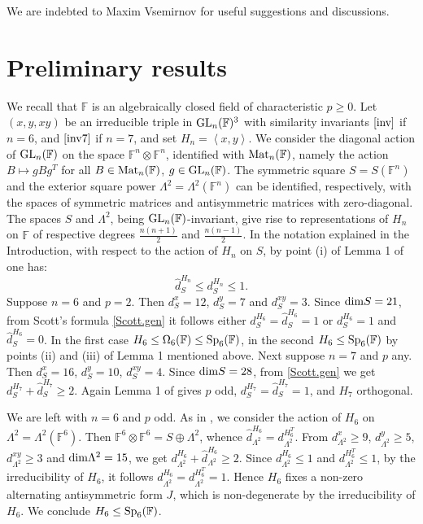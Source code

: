 \documentclass{amsart}
\theoremstyle{remark}
\begin{document}
We are indebted to Maxim Vsemirnov for useful suggestions and discussions.

\section{Preliminary results}\label{prelim}

We recall that ${\mathbb{F}}$ is an algebraically closed field of characteristic $p\ge 0$.
Let $(x,y,xy)$ be an irreducible triple in ${\mathop{\rm GL}\nolimits}_n({\mathbb{F}})^3$
with similarity invariants $\eqref{inv}$ if $n=6$, and $\eqref{inv7}$ if  $n=7$, 
and set $H_n=\left\langle x,y\right\rangle$.
We consider the diagonal action of ${\mathop{\rm GL}\nolimits}_n({\mathbb{F}})$ on the space ${\mathbb{F}}^n\otimes {\mathbb{F}}^n$,
identified with ${\mathop{\rm Mat}\nolimits}_n({\mathbb{F}})$, namely the action $B\mapsto gBg^T$ for all $B\in {\mathop{\rm Mat}\nolimits}_n({\mathbb{F}})$, $g\in{\mathop{\rm GL}\nolimits}_n({\mathbb{F}})$.  
The symmetric square $S=S({\mathbb{F}}^n)$ and the exterior 
square power $\Lambda^ 2=\Lambda^2({\mathbb{F}}^n)$ can be identified, respectively, with the spaces
of symmetric matrices
and antisymmetric matrices with zero-diagonal. The spaces $S$ and  $\Lambda^ 2$, being ${\mathop{\rm GL}\nolimits}_n({\mathbb{F}})$-invariant,
give rise to representations of $H_n$ on ${\mathbb{F}}$ of respective degrees $\frac{n(n+1)}{2}$ and
$\frac{n(n-1)}{2}$.
In the notation explained in the Introduction, with respect to 
the action of $H_n$ on  $S$, by point (i) of Lemma 1 of \cite{TV1} one has:
$$\hat d_{S }^ {H_n}\le d_{S}^ {H_n} \le 1 .$$
Suppose $n=6$ and $p=2$. Then $d_{S}^ x= 12$, $d_{S}^ y= 7$ and $d_{S}^ {xy}= 3$.
Since ${\mathop{\rm dim}\nolimits } S=21$, from  Scott's formula \eqref{Scott.gen} it follows  either 
$d_S^{H_6}= \hat d_S^ {H_6}= 1$ or $d_S^ {H_6}=1$ and $\hat d_S^{H_6}=0$.
In the first case $H_6\le \Omega_6({\mathbb{F}})\le {\mathop{\rm Sp}\nolimits}_6({\mathbb{F}})$, in the second $H_6\le {\mathop{\rm Sp}\nolimits}_6({\mathbb{F}})$  by points (ii)
and  (iii) of Lemma 1 mentioned above.
Next suppose $n=7$ and $p$ any. Then  $d_{S}^ x= 16$, $d_{S}^ y= 10$, $d_{S}^ {xy}= 4$.  Since ${\mathop{\rm dim}\nolimits } S=28$, 
from  \eqref{Scott.gen} we get $d_S^{H_7}+\hat d_S^ {H_7}\ge 2$. Again Lemma 1 of \cite{TV1} gives $p$ odd,
$d_S^{H_7}= \hat d_S^ {H_7}= 1$, and $H_7$ orthogonal.

We are left with  $n=6$ and $p$ odd. As in \cite{V3}, we consider the action 
of $H_6$ on $\Lambda^ 2=\Lambda^2({\mathbb{F}}^6)$.
Then ${\mathbb{F}}^6\otimes {\mathbb{F}}^6= S\oplus \Lambda^2$, whence
$\hat d_{\Lambda ^2}^{H_6}=d_{\Lambda ^2}^ {H_6^T}$. From $d_{\Lambda ^2}^ x\geq 9$, $d_{\Lambda ^2}^ y\ge 5$, $d_{\Lambda ^2}^ {xy}\ge 3$
and  ${\mathop{\rm dim}\nolimits } \Lambda^2 =15$,  we get $d_{\Lambda ^2}^ {H_6}+ \hat d_{\Lambda ^2}^{H_6}\ge 2$.
Since  $d_{\Lambda ^2}^ {H_6}\le  1$ and $d_{\Lambda ^2}^ {H_6^T}\le 1$, by the irreducibility of  $H_6$,
it follows $d_{\Lambda ^2}^ {H_6}= d_{\Lambda ^2}^ {H_6^T}= 1$. Hence $H_6$ fixes a non-zero alternating 
antisymmetric form $J$, which is non-degenerate by the irreducibility of $H_6$. 
We conclude $H_6\le {\mathop{\rm Sp}\nolimits}_6({\mathbb{F}})$.
\end{document}
